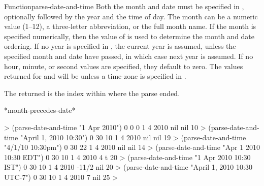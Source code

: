 \documentclass[10pt,twoside,english,pdftex]{article}
\begin{document}
\begin{functiondoc}{Function}{parse-date-and-time}
\fndescription
%
Both the month and date must be specified in , optionally followed
by the year and the time of day. The month can be a numeric value (1--12), a
three-letter abbreviation, or the full month name.  If the month is specified
numerically, then the value of  is used to
determine the month and date ordering. If no year is specified in
, the current year is assumed, unless the specified month and date
have passed, in which case next year is assumed.  If no hour, minute, or
second values are specified, they default to zero.  The values returned for
 and  will be \nil{}
unless a time-zone is specified in .

The returned  is the index within  where the
parse ended.

\begin{alsos}{*month-precedes-date*}
\end{alsos}

\fnexamples
%
\W\supp
\begin{example}
  > (parse-date-and-time "1 Apr 2010")
  0
  0
  0
  1
  4
  2010
  nil
  nil
  10\goodpagebreak
  > (parse-date-and-time "April 1, 2010 10:30")
  0
  30
  10
  1
  4
  2010
  nil
  nil
  19\goodpagebreak
  > (parse-date-and-time "4/1/10 10:30pm")
  0
  30
  22
  1
  4
  2010
  nil
  nil
  14\goodpagebreak
  > (parse-date-and-time "Apr 1 2010 10:30 EDT")
  0
  30
  10
  1
  4
  2010
  4
  t
  20\goodpagebreak
  > (parse-date-and-time "1 Apr 2010 10:30 IST")
  0
  30
  10
  1
  4
  2010
  -11/2
  nil
  20\goodpagebreak
  > (parse-date-and-time "April 1, 2010 10:30 UTC-7")
  0
  30
  10
  1
  4
  2010
  7
  nil
  25
  >
\end{example}

\end{functiondoc}

\end{document}
